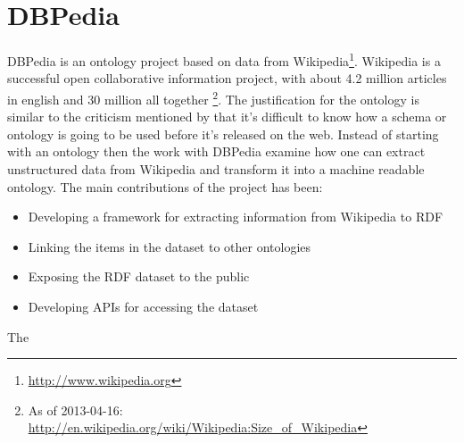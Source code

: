 \section{DBPedia}
DBPedia is an ontology project based on data from Wikipedia\footnote{\url{http://www.wikipedia.org}}.
Wikipedia is a successful open collaborative information project,
with about 4.2 million articles in english and 30 million all together
\footnote{As of 2013-04-16: \url{http://en.wikipedia.org/wiki/Wikipedia:Size_of_Wikipedia}}.
The justification for the ontology is similar to the criticism mentioned by \citet{Shirky2007}
that it's difficult to know how a schema or ontology is going to be used before it's released on the web.
Instead of starting with an ontology then the work with DBPedia examine how one can extract unstructured data
from Wikipedia and transform it into a machine readable ontology.
The main contributions of the project has been\citep{Auer2007}:

\begin{itemize}
	\item Developing a framework for extracting information from Wikipedia to RDF
	\item Linking the items in the dataset to other ontologies
	\item Exposing the RDF dataset to the public
	\item Developing APIs for accessing the dataset
\end{itemize}

The




\citep{Auer2007}
\citep{Auer2007a}

